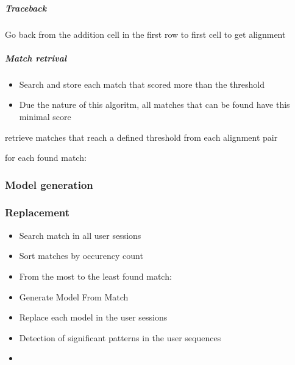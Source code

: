 \subparagraph{Traceback}
Go back from the addition cell in the first row to first cell to get alignment

\subparagraph{Match retrival}
	\begin{itemize}
		\item Search and store  each match that scored more than the threshold
		\item Due the nature of this algoritm, all matches that can be found have this minimal score
	\end{itemize}
		\item retrieve matches that reach a defined threshold from each alignment pair
		\item for each found match:
\subsubsection{Model generation}
\subsubsection{Replacement}
	\begin{itemize}
		\item Search match in all user sessions
		\item Sort matches by occurency count
		\item From the most to the least found match:
		\item Generate Model From Match 
		\item Replace each model in the user sessions
	\end{itemize}
	\begin{itemize}
		\item Detection of significant patterns in the user sequences
		\item 
	\end{itemize}




